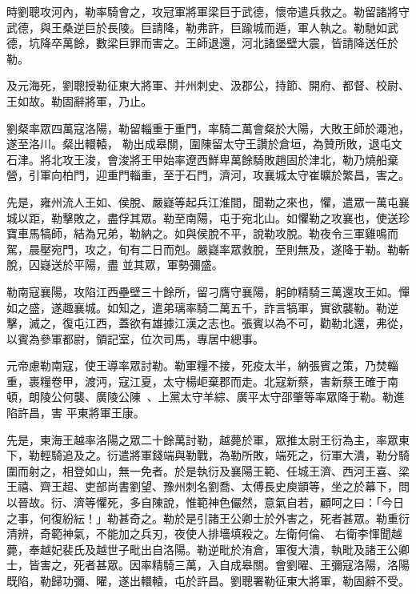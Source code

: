 \begin{pinyinscope}
 時劉聰攻河內，勒率騎會之，攻冠軍將軍梁巨于武德，懷帝遣兵救之。勒留諸將守武德，與王桑逆巨於長陵。巨請降，勒弗許，巨踰城而遁，軍人執之。勒馳如武德，坑降卒萬餘，數梁巨罪而害之。王師退還，河北諸堡壁大震，皆請降送任於勒。



 及元海死，劉聰授勒征東大將軍、并州刺史、汲郡公，持節、開府、都督、校尉、王如故。勒固辭將軍，乃止。



 劉粲率眾四萬寇洛陽，勒留輜重于重門，率騎二萬會粲於大陽，大敗王師於澠池，遂至洛川。粲出轘轅，
 勒出成皋關，圍陳留太守王讚於倉垣，為贊所敗，退屯文石津。將北攻王浚，會浚將王甲始率遼西鮮卑萬餘騎敗趙固於津北，勒乃燒船棄營，引軍向柏門，迎重門輜重，至于石門，濟河，攻襄城太守崔曠於繁昌，害之。



 先是，雍州流人王如、侯脫、嚴嶷等起兵江淮間，聞勒之來也，懼，遣眾一萬屯襄城以距，勒擊敗之，盡俘其眾。勒至南陽，屯于宛北山。如懼勒之攻襄也，使送珍寶車馬犒師，結為兄弟，勒納之。如與侯脫不平，說勒攻脫。勒夜令三軍雞鳴而駕，晨壓宛門，攻之，旬有二日而剋。嚴嶷率眾救脫，至則無及，遂降于勒。勒斬脫，囚嶷送於平陽，盡
 並其眾，軍勢彌盛。



 勒南寇襄陽，攻陷江西壘壁三十餘所，留刁膺守襄陽，躬帥精騎三萬還攻王如。憚如之盛，遂趣襄城。如知之，遣弟璃率騎二萬五千，詐言犒軍，實欲襲勒。勒逆擊，滅之，復屯江西，蓋欲有雄據江漢之志也。張賓以為不可，勸勒北還，弗從，以賓為參軍都尉，領記室，位次司馬，專居中總事。



 元帝慮勒南寇，使王導率眾討勒。勒軍糧不接，死疫太半，納張賓之策，乃焚輜重，裹糧卷甲，渡沔，寇江夏，太守楊岠棄郡而走。北寇新蔡，害新蔡王確于南頓，朗陵公何襲、廣陵公陳、上黨太守羊綜、廣平太守邵肇等率眾降于勒。勒進陷許昌，害
 平東將軍王康。



 先是，東海王越率洛陽之眾二十餘萬討勒，越薨於軍，眾推太尉王衍為主，率眾東下，勒輕騎追及之。衍遣將軍錢端與勒戰，為勒所敗，端死之，衍軍大潰，勒分騎圍而射之，相登如山，無一免者。於是執衍及襄陽王範、任城王濟、西河王喜、梁王禧、齊王超、吏部尚書劉望、豫州刺名劉喬、太傅長史庾顗等，坐之於幕下，問以晉故。衍、濟等懼死，多自陳說，惟範神色儼然，意氣自若，顧呵之曰：「今日之事，何復紛紜！」勒甚奇之。勒於是引諸王公卿士於外害之，死者甚眾。勒重衍清辨，奇範神氣，不能加之兵刃，夜使人排墻填殺之。左衛何倫、
 右衛李惲聞越薨，奉越妃裴氏及越世子毗出自洛陽。勒逆毗於洧倉，軍復大潰，執毗及諸王公卿士，皆害之，死者甚眾。因率精騎三萬，入自成皋關。會劉曜、王彌寇洛陽，洛陽既陷，勒歸功彌、曜，遂出轘轅，屯於許昌。劉聰署勒征東大將軍，勒固辭不受。




\end{pinyinscope}
